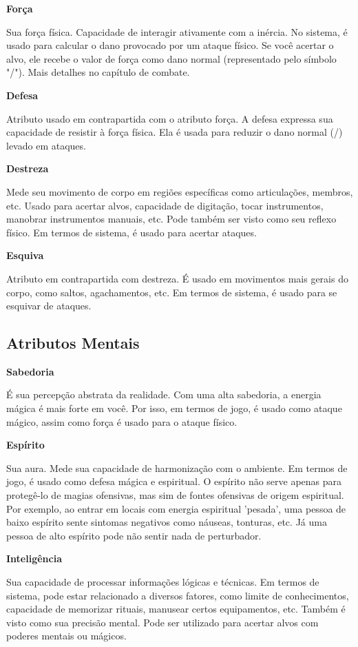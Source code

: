 \textbf{Força}
 
Sua força física. Capacidade de interagir ativamente com a inércia. No sistema, é usado para calcular o dano provocado por um ataque físico. Se você acertar o alvo, ele recebe o valor de força como dano normal (representado pelo símbolo "/"). Mais detalhes no capítulo de combate.

\textbf{Defesa}

Atributo usado em contrapartida com o atributo força. A defesa expressa sua capacidade de resistir à força física. Ela é usada para reduzir o dano normal (/) levado em ataques. 

\textbf{Destreza}

Mede seu movimento de corpo em regiões específicas como articulações, membros, etc. Usado para acertar alvos, capacidade de digitação, tocar instrumentos, manobrar instrumentos manuais, etc. Pode também ser visto como seu reflexo físico. Em termos de sistema, é usado para acertar ataques.

\textbf{Esquiva}

Atributo em contrapartida com destreza. É usado em movimentos mais gerais do corpo, como saltos, agachamentos, etc. Em termos de sistema, é usado para se esquivar de ataques.

\subsection{Atributos Mentais}

\textbf{Sabedoria}

É sua percepção abstrata da realidade. Com uma alta sabedoria, a energia mágica é mais forte em você. Por isso, em termos de jogo, é usado como ataque mágico, assim como força é usado para o ataque físico. 

\textbf{Espírito}

Sua aura. Mede sua capacidade de harmonização com o ambiente. Em termos de jogo, é usado como defesa mágica e espiritual. O espírito não serve apenas para protegê-lo de magias ofensivas, mas sim de fontes ofensivas de origem espiritual. Por exemplo, ao entrar em locais com energia espiritual 'pesada', uma pessoa de baixo espírito sente sintomas negativos como náuseas, tonturas, etc. Já uma pessoa de alto espírito pode não sentir nada de perturbador.

\textbf{Inteligência}

Sua capacidade de processar informações lógicas e técnicas. Em termos de sistema, pode estar relacionado a diversos fatores, como limite de conhecimentos, capacidade de memorizar rituais, manusear certos equipamentos, etc. Também é visto como sua precisão mental. Pode ser utilizado para acertar alvos com poderes mentais ou mágicos.

